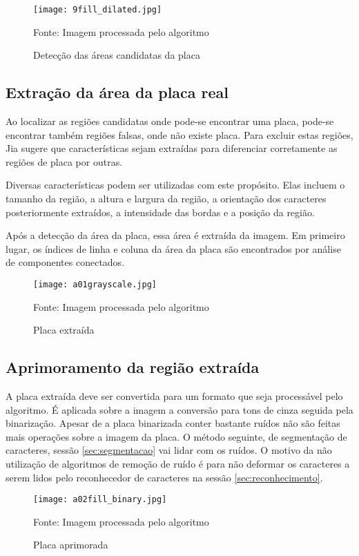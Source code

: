 \begin{figure}[H]
	\centering
	\texttt{[image: 9fill\_dilated.jpg]}
	\caption{Detecção das áreas candidatas da placa}
Fonte: Imagem processada pelo algoritmo
	\label{fig:ext_plate_area_detection}
\end{figure}

\subsection{Extração da área da placa real}

Ao localizar as regiões candidatas onde pode-se encontrar uma placa, pode-se encontrar também regiões falsas, onde não existe placa. Para excluir estas regiões, Jia \cite{jia2007region} sugere que características sejam extraídas para diferenciar corretamente as regiões de placa por outras. 

Diversas características podem ser utilizadas com este propósito. Elas incluem o tamanho da região, a altura e largura da região, a orientação dos caracteres posteriormente extraídos, a intensidade das bordas e a posição da região. 
 
Após a detecção da área da placa, essa área é extraída da imagem. Em primeiro lugar, os índices de linha e coluna da área da placa são encontrados por análise de componentes conectados.

\begin{figure}[H]
	\centering
	\texttt{[image: a01grayscale.jpg]}
	\caption{Placa extraída}
Fonte: Imagem processada pelo algoritmo
	\label{fig:ext_true_number_plate}
\end{figure}

\subsection{Aprimoramento da região extraída}

A placa extraída deve ser convertida para um formato que seja processável pelo algoritmo. É aplicada sobre a imagem a conversão para tons de cinza seguida pela binarização. Apesar de a placa binarizada conter bastante ruídos não são feitas mais operações sobre a imagem da placa. O método seguinte, de segmentação de caracteres, sessão \ref{sec:segmentacao} vai lidar com os ruídos. O motivo da não utilização de algoritmos de remoção de ruído é para não deformar os caracteres a serem lidos pelo reconhecedor de caracteres na sessão \ref{sec:reconhecimento}.

\begin{figure}[H]
	\centering
	\texttt{[image: a02fill\_binary.jpg]}
	\caption{Placa aprimorada}
Fonte: Imagem processada pelo algoritmo
	\label{fig:ext_enhanced_number_plate}
\end{figure}

